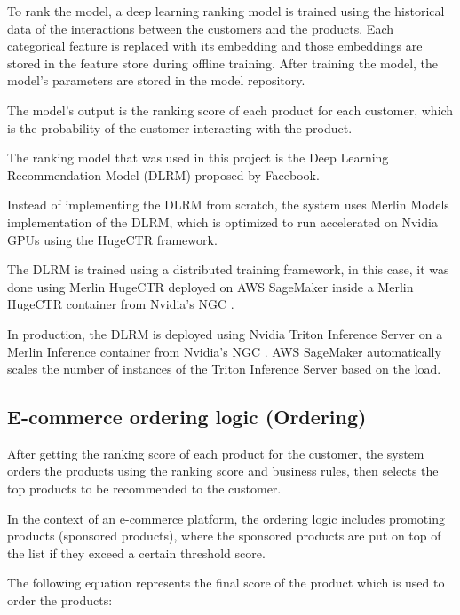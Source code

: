 To rank the model, a deep learning ranking model is trained using the historical data of the interactions between the customers and the products.
Each categorical feature is replaced with its embedding and those embeddings are stored in the feature store during offline training. 
After training the model, the model's parameters are stored in the model repository.

The model's output is the ranking score of each product for each customer, which is the probability of the customer interacting with the product.

The ranking model that was used in this project is the Deep Learning Recommendation Model (DLRM) \cite{facebook_dlrm} proposed by Facebook.

Instead of implementing the DLRM from scratch, 
the system uses Merlin Models \cite{MerlinModels}
 implementation of the DLRM, 
 which is optimized to run accelerated on Nvidia GPUs using the HugeCTR \cite{NvidiaHugeCTR} framework.

The DLRM is trained using a distributed training framework, in this case, it was done using Merlin HugeCTR \cite{NvidiaHugeCTR} deployed on AWS SageMaker \cite{AwsSageMaker} inside a Merlin HugeCTR container \cite{HugeCTRContainer} from Nvidia's NGC \cite{NvidiaNGC}.

In production, the DLRM is deployed using Nvidia Triton Inference Server \cite{Triton} on a Merlin Inference container \cite{NvidiaMerlinInference} from Nvidia's NGC \cite{NvidiaNGC}.
AWS SageMaker \cite{AwsSageMaker} automatically scales the number of instances of the Triton Inference Server based on the load.

\subsection{E-commerce ordering logic (Ordering)}

After getting the ranking score of each product for the customer, the system orders the products using the ranking score and business rules, 
then selects the top products to be recommended to the customer.


In the context of an e-commerce platform, the ordering logic includes promoting products (sponsored products), 
where the sponsored products are put on top of the list if they exceed a certain threshold score.

The following equation represents the final score of the product which is used to order the products:

